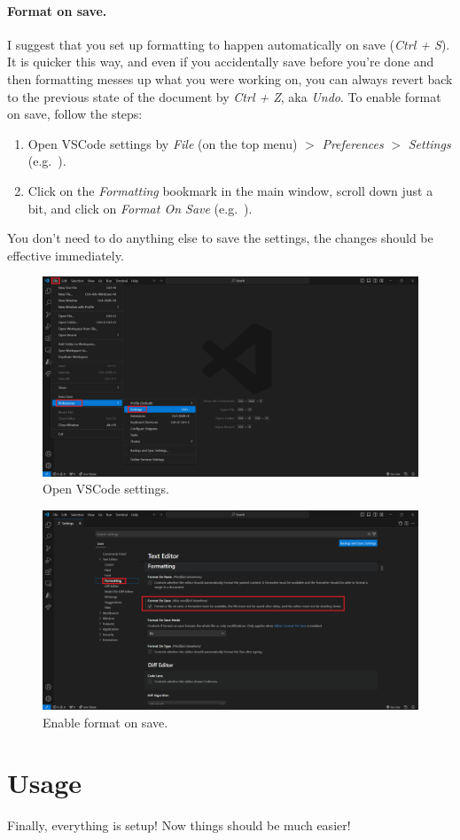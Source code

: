 \documentclass[a4paper,10pt]{article}
\begin{document}
\paragraph{Format on save.} I suggest that you set up formatting to happen automatically on save (\emph{Ctrl + S}). It is quicker this way, and even if you accidentally save before you're done and then formatting messes up what you were working on, you can always revert back to the previous state of the document by \emph{Ctrl + Z}, aka \emph{Undo}. To enable format on save, follow the steps:
\begin{enumerate}
    \item Open VSCode settings by \emph{File} (on the top menu) $>$ \emph{Preferences} $>$ \emph{Settings} (e.g.\ ).
    \item Click on the \emph{Formatting} bookmark in the main window, scroll down just a bit, and click on \emph{Format On Save} (e.g.\ ).
\end{enumerate}
You don't need to do anything else to save the settings, the changes should be effective immediately.

\begin{figure}[htbp]
    \centering
    \includegraphics[width=\textwidth]{vscode_settings.png}
    \caption{Open VSCode settings.}
    \label{fig:vscode_settings}   
\end{figure}

\begin{figure}[htbp]
    \centering
    \includegraphics[width=\textwidth]{format_on_save.png}
    \caption{Enable format on save.}
    \label{fig:format_on_save}   
\end{figure}


\section{Usage}

Finally, everything is setup! Now things should be much easier! 
\end{document}
